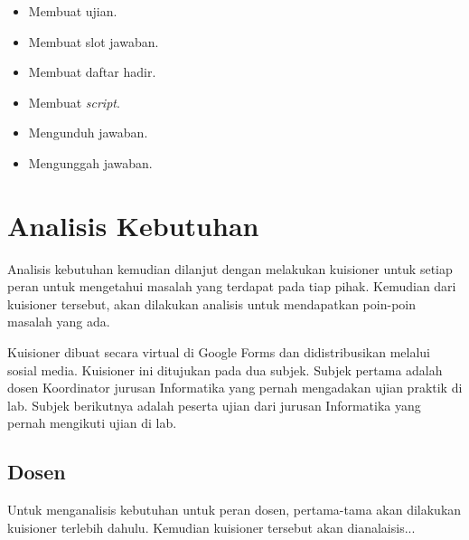         \begin{itemize}
            \item Membuat ujian.
            \item Membuat slot jawaban.
            \item Membuat daftar hadir.
            \item Membuat \textit{script}.
            \item Mengunduh jawaban.
            \item Mengunggah jawaban.
        \end{itemize}


    
\section{Analisis Kebutuhan}

    Analisis kebutuhan kemudian dilanjut dengan melakukan kuisioner untuk setiap
    peran untuk mengetahui masalah yang terdapat pada tiap pihak. Kemudian dari
    kuisioner tersebut, akan dilakukan analisis untuk mendapatkan poin-poin
    masalah yang ada.

    Kuisioner dibuat secara virtual di Google Forms dan didistribusikan melalui
    sosial media. Kuisioner ini ditujukan pada dua subjek. Subjek pertama adalah
    dosen Koordinator jurusan Informatika yang pernah mengadakan ujian praktik
    di lab. Subjek berikutnya adalah peserta ujian dari jurusan Informatika yang
    pernah mengikuti ujian di lab. 
    
\subsection{Dosen}
    Untuk menganalisis kebutuhan untuk peran dosen, pertama-tama akan dilakukan
    kuisioner terlebih dahulu. Kemudian kuisioner tersebut akan dianalaisis...

